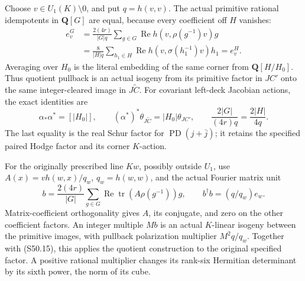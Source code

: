 Choose \(v\in U_1(K)\setminus0\), and put \(q=h(v,v)\).
The actual primitive rational idempotents in \(\mathbf Q[G]\)
are equal, because every coefficient off \(H\) vanishes:
\[
\begin{aligned}
 e_v^G&=\frac{2(4r)}{|G|q}\sum_{g\in G}
           \operatorname{Re}h(v,\rho(g^{-1})v)g\\
      &=\frac8{|H|q}\sum_{h_1\in H}
           \operatorname{Re}h(v,\sigma(h_1^{-1})v)h_1=e_v^H.
\end{aligned}                                                   \tag{S50.14}
\]
Averaging over \(H_0\) is the literal embedding of the
same corner from \(\mathbf Q[H/H_0]\). Thus quotient
pullback is an actual isogeny from its primitive factor in
\(JC'\) onto the same integer-cleared image in
\(J\widetilde C\). For covariant left-deck Jacobian
actions, the exact identities are
\[
 \alpha_*\alpha^*=[|H_0|],\qquad
 (\alpha^*)^*\theta_{J\widetilde C}=|H_0|\theta_{JC'},
 \qquad\frac{2|G|}{(4r)q}=\frac{2|H|}{4q}.              \tag{S50.15}
\]
The last equality is the real Schur factor for
\(\operatorname{PD}(j+\bar j)\); it retains the specified
paired Hodge factor and its corner \(K\)-action.

For the originally prescribed line \(Kw\), possibly outside
\(U_1\), use \(A(x)=v h(w,x)/q_w\), \(q_w=h(w,w)\),
and the actual Fourier matrix unit
\[
 b=\frac{2(4r)}{|G|}\sum_{g\in G}
          \operatorname{Re}\operatorname{tr}(A\rho(g^{-1}))g,
                    \qquad b^\dagger b=(q/q_w)e_w.
                                                               \tag{S50.16}
\]
Matrix-coefficient orthogonality gives \(A\), its conjugate,
and zero on the other coefficient factors. An integer multiple
\(Mb\) is an actual \(K\)-linear isogeny between the
primitive images, with pullback polarization multiplier
\(M^2q/q_w\). Together with (S50.15), this applies the
quotient construction to the original specified factor.
A positive rational multiplier changes its rank-six Hermitian
determinant by its sixth power, the norm of its cube.

